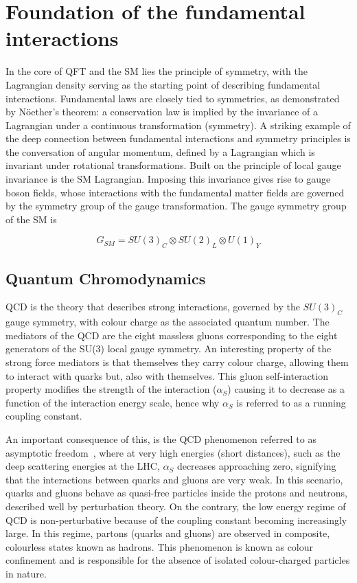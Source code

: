 \section{Foundation of the fundamental interactions}

In the core of QFT and the SM lies the principle of symmetry, with the Lagrangian density serving as the starting point of describing fundamental interactions. Fundamental laws are closely tied to symmetries, as demonstrated by N\"{o}ether's theorem: a conservation law is implied by the invariance of a Lagrangian under a continuous transformation (symmetry). A striking example of the deep connection between fundamental interactions and symmetry principles is the conversation of angular momentum, defined by a Lagrangian which is invariant under rotational transformations. Built on the principle of local gauge invariance is the SM Lagrangian. Imposing this invariance gives rise to gauge boson fields, whose interactions with the fundamental matter fields are governed by the symmetry group of the gauge transformation. The gauge symmetry group of the SM is

\begin{equation}
G_{SM} = SU(3)_{C} \otimes SU(2)_{L} \otimes U(1)_{Y}
\end{equation}

\subsection{Quantum Chromodynamics}

\ac{QCD} is the theory that describes strong interactions, governed by the $SU(3)_{C}$ gauge symmetry, with colour charge as the associated quantum number. The mediators of the QCD are the eight massless gluons corresponding to the eight generators of the SU(3) local gauge symmetry. An interesting property of the strong force mediators is that themselves they carry colour charge, allowing them to interact with quarks but, also with themselves. This gluon self-interaction property modifies the strength of the interaction ($\alpha_{S}$) causing it to decrease as a function of the interaction energy scale, hence why $\alpha_{S}$ is referred to as a running coupling constant.

An important consequence of this, is the QCD phenomenon referred to as asymptotic freedom~\cite{AsymptoticFreedom_1,AsymptoticFreedom_2}, where at very high energies (short distances), such as the deep scattering energies at the LHC, $\alpha_{S}$ decreases approaching zero, signifying that the interactions between quarks and gluons are very weak. In this scenario, quarks and gluons behave as quasi-free particles inside the protons and neutrons, described well by perturbation theory. On the contrary, the  low energy regime of QCD is non-perturbative because of the coupling constant becoming increasingly large. In this regime, partons (quarks and gluons) are observed in composite, colourless states known as hadrons. This phenomenon is known as colour confinement and is responsible for the absence of isolated colour-charged particles in nature. 

